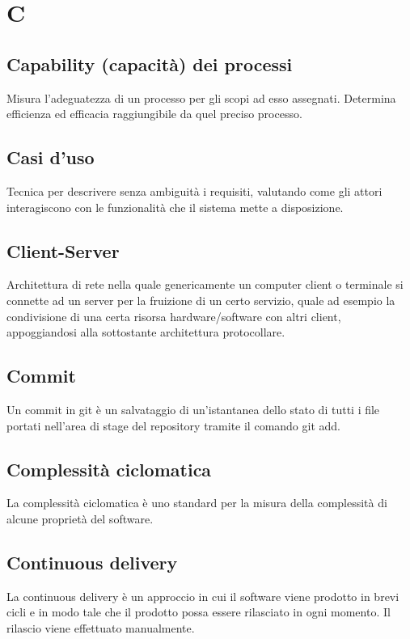 {	\section{C}
	\subsection{Capability (capacità) dei processi}
	Misura l'adeguatezza di un processo per gli scopi ad esso assegnati. Determina efficienza ed efficacia raggiungibile da quel preciso processo.
	
	\subsection{Casi d'uso}
	Tecnica per descrivere senza ambiguità i requisiti, valutando come gli attori interagiscono con le funzionalità che il sistema mette a disposizione.
	
	\subsection{Client-Server}
	Architettura di rete nella quale genericamente un computer client o terminale si connette ad un server per la fruizione di un certo servizio, quale ad esempio la condivisione di una certa risorsa hardware/software con altri client, appoggiandosi alla sottostante architettura protocollare.
	
	\subsection{Commit}
	Un commit in git è un salvataggio di un'istantanea dello stato di tutti i file portati nell'area di stage del repository tramite il comando git add.
	
	\subsection{Complessità ciclomatica}
	La complessità ciclomatica è uno standard per la misura della complessità di alcune proprietà del software.
	
	\subsection{Continuous delivery}
	La continuous delivery è un approccio in cui il software viene prodotto in brevi cicli e in modo tale che il prodotto possa essere rilasciato in ogni momento. Il rilascio viene effettuato manualmente.
	
}
